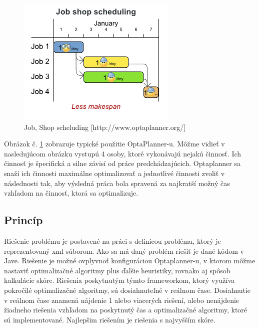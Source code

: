 \newpage
\begin{figure}[htb]

\begin{center}

\includegraphics[scale=0.5]{fig/useCaseOverview.jpg} 
\caption{Job, Shop scheluding  [http://www.optaplanner.org/] }
\label{obrazokUseCase}

\end{center}

\end{figure}
Obrázok č. \ref{obrazokUseCase} zobrazuje typické použitie OptaPlanner-u. Môžme vidieť v nasledujúcom obrázku vystupú 4 osoby, ktoré vykonávajú nejakú činnosť. Ich činnosť je špecifická a silne závisí od práce predchádzajúcich. Optaplanner sa snaží ich činnosti maximálne optimalizovať a jednotlivé činnosti zvoliť v následnosti tak, aby výsledná práca bola spravená za najkratší možný čas vzhľadom na činnosť, ktorá sa optimalizuje.


\subsection{Princíp}
Riešenie problému je postavené na práci s definícou problému, ktorý je reprezentovaný xml súborom. Ako sa má daný problém riešiť je dané kódom v Jave. Riešenie je možné ovplyvnoť konfiguráciou Optaplanner-u, v ktorom môžme nastaviť optimalizačné algoritmy plus ďalšie heuristiky, rovnako aj spôsob kalkulácie skóre. Riešenia poskytnutým týmto frameworkom, ktorý využíva pokročilé optimalizačné algoritmy, sú dosiahnuteľné v reálnom čase. Dosiahnutie v reálnom čase znamená nájdenie 1 alebo viacerých riešení, alebo nenájdenie žiadneho riešenia vzhľadom na poskytnutý čas a optimalizačné algoritmy, ktoré sú implementované. Najlepšim riešením je riešenia s najvyšším skóre.



\newpage
